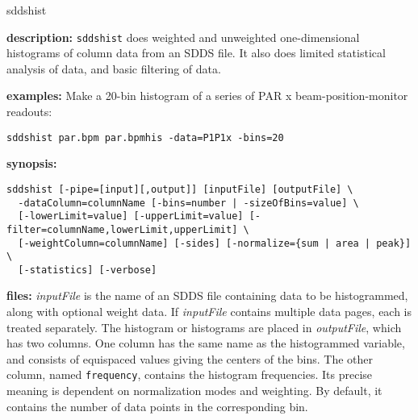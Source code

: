 \begin{sddsprog}{sddshist}
  \item \textbf{description:}
    \verb|sddshist| does weighted and unweighted one-dimensional histograms of column data from an SDDS file. It also does limited statistical analysis of data, and basic filtering of data.
  \item \textbf{examples:}
    Make a 20-bin histogram of a series of PAR x beam-position-monitor readouts:
    \begin{verbatim}
sddshist par.bpm par.bpmhis -data=P1P1x -bins=20
    \end{verbatim}
  \item \textbf{synopsis:}
    \begin{verbatim}
sddshist [-pipe=[input][,output]] [inputFile] [outputFile] \
  -dataColumn=columnName [-bins=number | -sizeOfBins=value] \
  [-lowerLimit=value] [-upperLimit=value] [-filter=columnName,lowerLimit,upperLimit] \
  [-weightColumn=columnName] [-sides] [-normalize={sum | area | peak}] \
  [-statistics] [-verbose]
    \end{verbatim}
  \item \textbf{files:}
    \emph{inputFile} is the name of an SDDS file containing data to be histogrammed, along with optional weight data. If \emph{inputFile} contains multiple data pages, each is treated separately. The histogram or histograms are placed in \emph{outputFile}, which has two columns. One column has the same name as the histogrammed variable, and consists of equispaced values giving the centers of the bins. The other column, named \verb|frequency|, contains the histogram frequencies. Its precise meaning is dependent on normalization modes and weighting. By default, it contains the number of data points in the corresponding bin.


\end{sddsprog}

